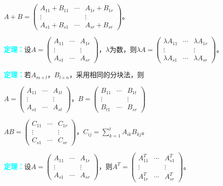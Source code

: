 \documentclass[UTF8, 12pt]{ctexart}
\begin{document}
$A+B=\left(
\begin{array}{ccc}
A_{11}+B_{11} & \cdots & A_{1r}+B_{1r} \\
\vdots & & \vdots \\
A_{s1}+B_{s1} & \cdots & A_{sr}+B_{sr}
\end{array}
\right)\text{。}$

\textcolor{aqua}{\textbf{定理：}}设$A=\left(
\begin{array}{ccc}
A_{11} & \cdots & A_{1r} \\
\vdots & & \vdots \\
A_{s1} & \cdots & A_{sr}
\end{array}
\right)$，$\lambda$为数，则$\lambda A=\left(
\begin{array}{ccc}
\lambda A_{11} & \cdots & \lambda A_{1r} \\
\vdots & & \vdots \\
\lambda A_{s1} & \cdots & \lambda A_{sr}
\end{array}
\right)$。\medskip

\textcolor{aqua}{\textbf{定理：}}若$A_{m\times l}$，$B_{l\times n}$，采用相同的分块法，则 \medskip

$A=\left(
\begin{array}{ccc}
A_{11} & \cdots & A_{1t} \\
\vdots & & \vdots \\
A_{s1} & \cdots & A_{st}
\end{array}
\right)\text{，}B=\left(
\begin{array}{ccc}
B_{11} & \cdots & B_{1t} \\
\vdots & & \vdots \\
B_{t1} & \cdots & B_{sr}
\end{array}
\right)$

$AB=\left(
\begin{array}{ccc}
C_{11} & \cdots & C_{1r} \\
\vdots & & \vdots \\
C_{s1} & \cdots & C_{sr}
\end{array}
\right)\text{，}C_{ij}=\sum\limits_{k=1}^tA_{ik}B_{kj}\text{。}$

\textcolor{aqua}{\textbf{定理：}}设$A=\left(
\begin{array}{ccc}
A_{11} & \cdots & A_{1r} \\
\vdots & & \vdots \\
A_{s1} & \cdots & A_{sr}
\end{array}
\right)$，则$A^T=\left(
\begin{array}{ccc}
A_{11}^T & \cdots & A_{s1}^T \\
\vdots & & \vdots \\
A_{1r}^T & \cdots & A_{sr}^T
\end{array}
\right)$。 \medskip
\end{document}
